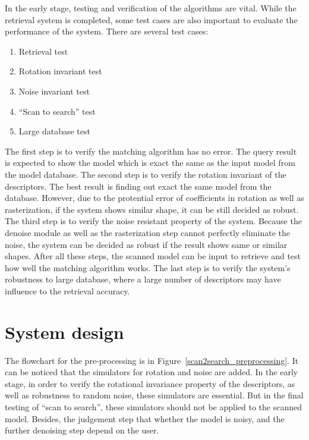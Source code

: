 In the early stage, testing and verification of the algorithms are vital. While the retrieval system is completed, some test cases are also important to evaluate the performance of the system. There are several test cases: 

\begin{enumerate}[1)]
\item Retrieval test
\item Rotation invariant test
\item Noise invariant test
\item ``Scan to search'' test
\item Large database test
\end{enumerate}

The first step is to verify the matching algorithm has no error. The query result is expected to show the model which is exact the same as the input model from the model database. The second step is to verify the rotation invariant of the descriptors. The best result is finding out exact the same model from the database. However, due to the protential error of coefficients in rotation as well as rasterization, if the system shows similar shape, it can be still decided as robust. The third step is to verify the noise resistant property of the system. Because the denoise module as well as the rasterization step cannot perfectly eliminate the noise, the system can be decided as robust if the result shows same or similar shapes. After all these steps, the scanned model can be input to retrieve and test how well the matching algorithm works. The last step is to verify the system's robustness to large database, where a large number of descriptors may have influence to the retrieval accuracy. 

\section{System design}

The flowchart for the pre-processing is in Figure~\ref{scan2search_preprocessing}. It can be noticed that the simulators for rotation and noise are added. In the early stage, in order to verify the rotational invariance property of the descriptors, as well as robustness to random noise, these simulators are essential. But in the final testing of ``scan to search'', these simulators should not be applied to the scanned model. Besides, the judgement step that whether the model is noisy, and the further denoising step depend on the user. 

